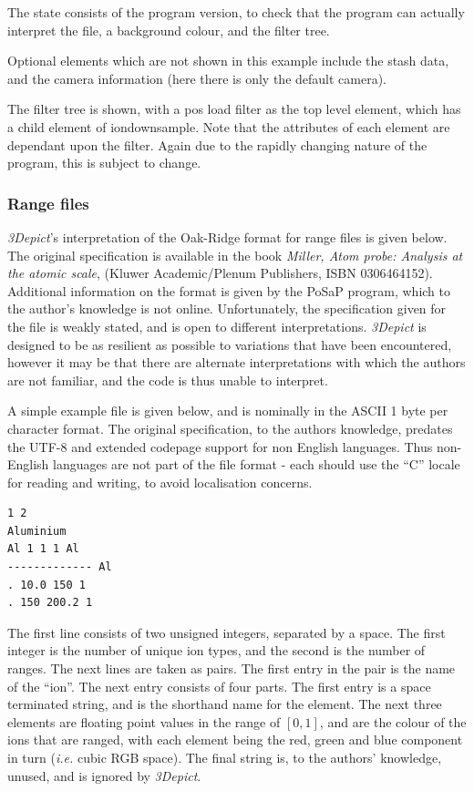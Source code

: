 \documentclass[10pt]{article}
\begin{document}
The state consists of the program version, to check that the program can actually interpret the file, a background colour, and the filter tree. 

Optional elements which are not shown in this example include the stash data, and the camera information (here there is only the default camera).

The filter tree is shown, with a pos load filter as the top level element, which has a child element of iondownsample. Note that the attributes of each element are dependant upon the filter. Again due to the rapidly changing nature of the program, this is subject to change.

\subsubsection{Range files}
\label{sec:rangeFormat}
\emph{3Depict}'s interpretation of the Oak-Ridge format for range files is given below. The original specification is available in the book \textit{Miller, Atom probe: Analysis at the atomic scale}, (Kluwer Academic/Plenum Publishers, ISBN 0306464152). Additional information on the format is given by the PoSaP program, which to the author's knowledge is not online. Unfortunately, the specification given for the file is weakly stated, and is open to different interpretations. \emph{3Depict} is designed to be as resilient as possible to variations that have been encountered, however it may be that there are alternate interpretations with which the authors are not familiar, and the code is thus unable to interpret.

A simple example file is given below, and is nominally in the ASCII 1 byte per character format. The original specification, to the authors knowledge, predates the UTF-8 and extended codepage support for non English languages. Thus non-English languages are not part of the file format - each should use the ``C'' locale for reading and writing, to avoid localisation concerns.

\begin{table}
\begin{verbatim}
1 2
Aluminium
Al 1 1 1 Al
------------- Al
. 10.0 150 1
. 150 200.2 1
\end{verbatim}
\end{table}

The first line consists of two unsigned integers, separated by a space. The first integer is the number of unique ion types, and the second is the number of ranges. The next lines are taken as pairs. The first entry in the pair is the name of the ``ion''. The next entry consists of four parts. The first entry is a space terminated string, and is the shorthand name for the element. The next three elements are floating point values in the range of $[0,1]$, and are the colour of the ions that are ranged, with each element being the red, green and blue component in turn (\emph{i.e.} cubic RGB space). The final string is, to the authors' knowledge, unused, and is ignored by \emph{3Depict}. 
\end{document}
